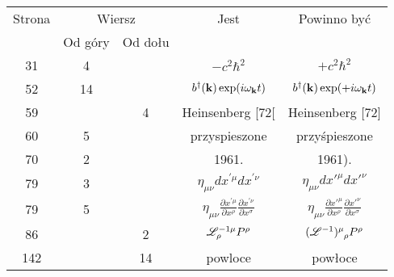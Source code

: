\documentclass[a4paper,11pt]{article}
\begin{document}
\begin{center}

  \begin{tabular}{|c|c|c|c|c|}
    \hline
    Strona & \multicolumn{2}{c|}{Wiersz} & Jest
                              & Powinno być \\ \cline{2-3}
    & Od góry & Od dołu & & \\
    \hline
    31 & 4 & & $-c^{ 2 } \hbar^{ 2 }$ & $+c^{ 2 } \hbar^{ 2 }$ \\
    52 & 14 & & $b^{ \dagger }( \mathbf{k} ) \exp( i \omega_{ \mathbf{k} } t )$
           & $b^{ \dagger }( \mathbf{k} ) \exp( +i \omega_{ \mathbf{k} } t )$ \\
    59 & & 4 & Heinsenberg [72[ & Heinsenberg [72] \\ %
    60 & 5 & & przyspieszone & przyśpieszone \\
    70 & 2 & & 1961. & 1961). \\
    79 & 3 & & $\eta_{ \mu \nu } dx^{ ' \mu } dx^{ ' \nu }$
           & $\eta_{ \mu \nu } dx'^{ \mu } dx'^{ \nu }$ \\
    79 & 5 & & $\eta_{ \mu \nu } \frac{ \partial x^{ ' \mu } }{ \partial x^{ \rho } }
               \frac{ \partial x^{ ' \nu } }{ \partial x^{ \sigma } }$
           & $\eta_{ \mu \nu } \frac{ \partial x'^{ \mu } }{ \partial x^{ \rho } }
             \frac{ \partial x'^{ \nu } }{ \partial x^{ \sigma } }$ \\
    86 & & 2 & $\mathcal{L}_{ \rho }^{ -1 \mu } P^{ \rho }$
           & $\tensor[]{ ( \Lcal^{ -1 } ) }{ ^{ \mu }_{ \rho } } P^{ \rho }$ \\
    142 & & 14 & powloce & powłoce \\
    \hline
  \end{tabular}






\end{center}
\end{document}
